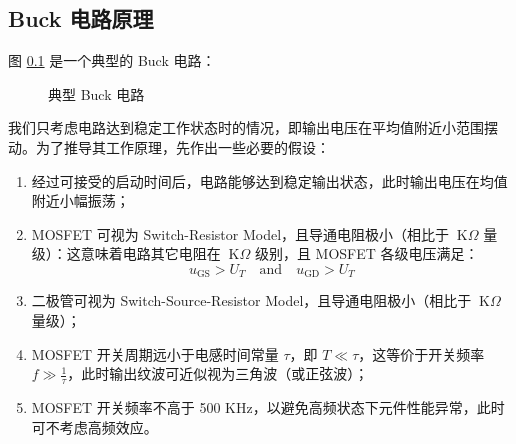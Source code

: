 \documentclass[UTF8]{report}
\def\kO{\ \mathrm{K}\Omega}
\def\KO{\ \mathrm{K}\Omega}
\theoremstyle{MyLineTheoremStyle} %
\theoremstyle{MyBlockTheoremStyle} %
\theoremstyle{MySubsubsectionStyle} %
\begin{document}
\subsection{Buck 电路原理}
图 \ref{} 是一个典型的 Buck 电路：
\begin{figure}[H]\centering
    \caption{典型 Buck 电路}
\end{figure}
我们只考虑电路达到稳定工作状态时的情况，即输出电压在平均值附近小范围摆动。为了推导其工作原理，先作出一些必要的假设：
\begin{enumerate}
\item 经过可接受的启动时间后，电路能够达到稳定输出状态，此时输出电压在均值附近小幅振荡；
\item MOSFET 可视为 Switch-Resistor Model，且导通电阻极小（相比于 $\KO$ 量级）：这意味着电路其它电阻在 $\kO$ 级别，且 MOSFET 各级电压满足：
\begin{equation}
u_{\text{GS}} > U_T \quad \text{and} \quad u_{\text{GD}} > U_T
\end{equation}
\item 二极管可视为 Switch-Source-Resistor Model，且导通电阻极小（相比于 $\KO$ 量级）；
\item MOSFET 开关周期远小于电感时间常量 $\tau$，即 $T \ll \tau$，这等价于开关频率 $f \gg \frac{1}{\tau}$，此时输出纹波可近似视为三角波（或正弦波）；
\item MOSFET 开关频率不高于 500 KHz，以避免高频状态下元件性能异常，此时可不考虑高频效应。
\end{enumerate}
\end{document}
